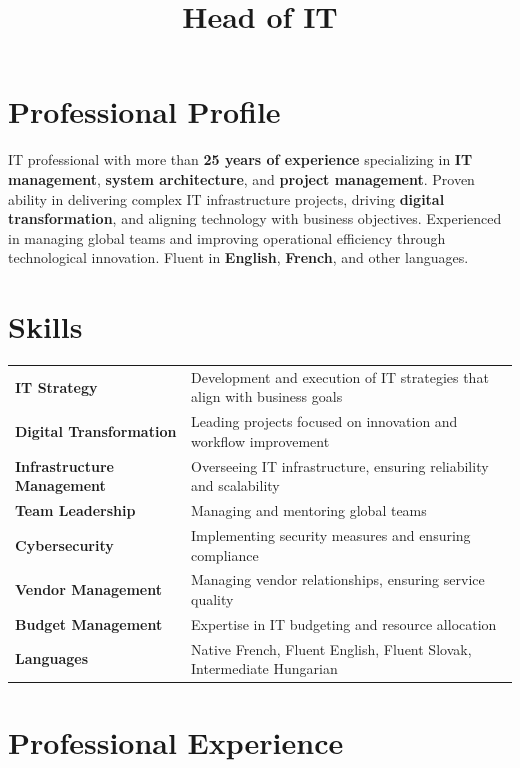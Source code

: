 \documentclass[10pt,a4paper,sans]{moderncv}
\title{Head of IT}
\begin{document}
\makecvtitle

\section{Professional Profile}
IT professional with more than \textbf{25 years of experience} specializing in \textbf{IT management}, \textbf{system architecture}, and \textbf{project management}. Proven ability in delivering complex IT infrastructure projects, driving \textbf{digital transformation}, and aligning technology with business objectives. Experienced in managing global teams and improving operational efficiency through technological innovation. Fluent in \textbf{English}, \textbf{French}, and other languages.

\section{Skills}
\begin{tabularx}{\textwidth}{@{}l X@{}}
\textbf{IT Strategy} & Development and execution of IT strategies that align with business goals \\
\textbf{Digital Transformation} & Leading projects focused on innovation and workflow improvement \\
\textbf{Infrastructure Management} & Overseeing IT infrastructure, ensuring reliability and scalability \\
\textbf{Team Leadership} & Managing and mentoring global teams \\
\textbf{Cybersecurity} & Implementing security measures and ensuring compliance \\
\textbf{Vendor Management} & Managing vendor relationships, ensuring service quality \\
\textbf{Budget Management} & Expertise in IT budgeting and resource allocation \\
\textbf{Languages} & Native French, Fluent English, Fluent Slovak, Intermediate Hungarian \\
\end{tabularx}

\section{Professional Experience}
\end{document}
